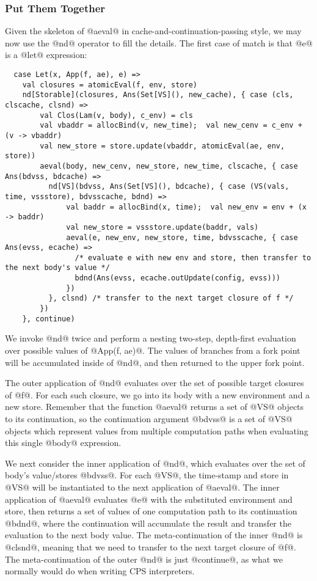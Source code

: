 \documentclass[acmsmall, review]{acmart}\settopmatter{}
\begin{document}
\subsubsection{Put Them Together}
Given the skeleton of @aeval@ in cache-and-continuation-passing style, we may now
use the @nd@ operator to fill the details. The first case of match is that @e@
is a @let@ expression:

\begin{lstlisting}
  case Let(x, App(f, ae), e) =>
    val closures = atomicEval(f, env, store)
    nd[Storable](closures, Ans(Set[VS](), new_cache), { case (cls, clscache, clsnd) =>
        val Clos(Lam(v, body), c_env) = cls
        val vbaddr = allocBind(v, new_time);  val new_cenv = c_env + (v -> vbaddr)
        val new_store = store.update(vbaddr, atomicEval(ae, env, store))
        aeval(body, new_cenv, new_store, new_time, clscache, { case Ans(bdvss, bdcache) =>
          nd[VS](bdvss, Ans(Set[VS](), bdcache), { case (VS(vals, time, vssstore), bdvsscache, bdnd) =>
              val baddr = allocBind(x, time);  val new_env = env + (x -> baddr)
              val new_store = vssstore.update(baddr, vals)
              aeval(e, new_env, new_store, time, bdvsscache, { case Ans(evss, ecache) =>
                /* evaluate e with new env and store, then transfer to the next body's value */
                bdnd(Ans(evss, ecache.outUpdate(config, evss)))
              })
          }, clsnd) /* transfer to the next target closure of f */
        })
    }, continue)
\end{lstlisting}

We invoke @nd@ twice and perform a nesting two-step, depth-first evaluation over 
possible values of @App(f, ae)@. The values of branches from a fork point will be
accumulated inside of @nd@, and then returned to the upper fork point.

The outer application of @nd@ evaluates over the set of possible target closures of
@f@. For each such closure, we go into its body with a new environment and a new store.
Remember that the function @aeval@ returns a set of @VS@ objects to its continuation,
so the continuation argument @bdvss@ is a set of @VS@ objects which represent values
from multiple computation paths when evaluating this single @body@ expression.

We next consider the inner application of @nd@, which evaluates over the set of body's 
value/stores @bdvss@. For each @VS@, the time-stamp and store in @VS@ will be instantiated to
the next application of @aeval@. The inner application of @aeval@ evaluates @e@ with the
substituted environment and store, then returns a set of values of one computation path 
to its continuation @bdnd@, where the continuation will accumulate the result and 
transfer the evaluation to the next body value.
The meta-continuation of the inner @nd@ is @clsnd@, meaning that we need to transfer 
to the next target closure of @f@. The meta-continuation of the outer @nd@ is just 
@continue@, as what we normally would do when writing CPS interpreters.
\end{document}
